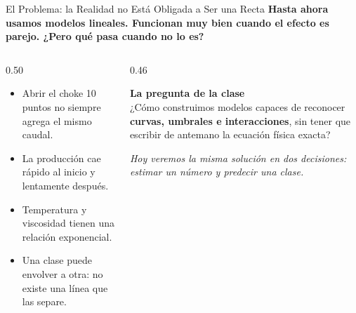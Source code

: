 \documentclass[aspectratio=169, 11pt]{beamer}
\begin{document}
\begin{frame}{El Problema: la Realidad no Está Obligada a Ser una Recta}
  \vspace{-6pt}
  {\small\color{arcaDark}\bfseries
    Hasta ahora usamos modelos lineales. Funcionan muy bien cuando el efecto es parejo. ¿Pero qué pasa cuando no lo es?}

  \vspace{6pt}
  \begin{columns}[T]
    \begin{column}{0.50\textwidth}
      {\footnotesize\color{textMuted}
      \begin{itemize}\setlength{\itemsep}{7pt}
        \item[{\color{arcaRed}\scriptsize\faOilCan}]
          Abrir el choke 10 puntos no siempre agrega el mismo caudal.
        \item[{\color{arcaRed}\scriptsize\faChartLine}]
          La producción cae rápido al inicio y lentamente después.
        \item[{\color{arcaRed}\scriptsize\faThermometerHalf}]
          Temperatura y viscosidad tienen una relación exponencial.
        \item[{\color{arcaRed}\scriptsize\faProjectDiagram}]
          Una clase puede envolver a otra: no existe una línea que las separe.
      \end{itemize}}
    \end{column}
    \begin{column}{0.46\textwidth}
      \begin{tcolorbox}[colback=arcaGray,colframe=arcaRed,boxrule=0pt,
        leftrule=3pt,arc=3pt,left=7pt,right=7pt,top=7pt,bottom=7pt]
        {\small\color{arcaDark}\bfseries La pregunta de la clase}\\[5pt]
        {\footnotesize\color{textMuted}
          ¿Cómo construimos modelos capaces de reconocer
          \textbf{curvas, umbrales e interacciones}, sin tener que
          escribir de antemano la ecuación física exacta?}
      \end{tcolorbox}
      \vspace{7pt}
      {\scriptsize\color{arcaDark}\itshape
        Hoy veremos la misma solución en dos decisiones:
        estimar un número y predecir una clase.}
    \end{column}
  \end{columns}
\end{frame}
\end{document}

